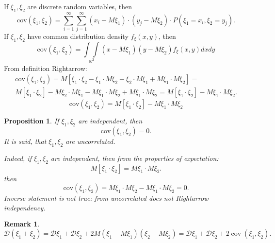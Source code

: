 \documentclass[12pt,letterpaper]{report}
\newtheorem{proposition}[theorem]{Proposition}  %
\newtheorem*{remark}{Remark}
\begin{document}
If $\xi_1, \xi_2$ are discrete random variables, then
\begin{equation}
    \text{cov}(\xi_1, \xi_2) = \sum_{i=1}^{\infty}\sum_{j=1}^{\infty} (x_i - M\xi_1) \cdot (y_j - M\xi_2) \cdot P(\xi_1 = x_i, \xi_2 = y_j).
\end{equation}
If $\xi_1,\xi_2$ have common distribution density $f_{\xi}(x,y)$, then 
\begin{equation}
    \text{cov}(\xi_1,\xi_2) = \underset{\mathbb{R}^2}{\int\int}(x-M\xi_1)(y-M\xi_2) f_{\xi}(x,y)dxdy
\end{equation}
From definition Rightarrow:
\begin{gather*}
    \text{cov}(\xi_1, \xi_2) = M[\xi_1\cdot\xi_2 - \xi_1\cdot M\xi_2 - \xi_2\cdot M\xi_1 + M\xi_1 \cdot M\xi_2] = \\
    M[\xi_1\cdot\xi_2] - M\xi_2\cdot M\xi_1 - M\xi_1\cdot M\xi_2 + M\xi_1 \cdot M\xi_2 =
    M[\xi_1 \cdot \xi_2] - M\xi_1 \cdot M\xi_2.
\end{gather*}
\begin{equation}
    \text{cov}(\xi_1,\xi_2) = M[\xi_1\cdot\xi_2] - M\xi_1\cdot M\xi_2
\end{equation}

\begin{proposition}
    If $\xi_1, \xi_2$ are independent, then
    \[
        \text{cov}(\xi_1, \xi_2) = 0
    .\] 
    It is said, that $\xi_1,\xi_2$ are uncorrelated.

    Indeed, if $\xi_1, \xi_2$ are independent, then from the properties of expectation:
    \[
        M[\xi_1\cdot\xi_2] = M\xi_1\cdot M\xi_2
    .\] 
    then 
    \[
        \text{cov}(\xi_1,\xi_2) = M\xi_1\cdot M\xi_2 - M\xi_1\cdot M\xi_2 = 0
    .\] 
    Inverse statement is not true: from uncorrelated does not Rightarrow independency.
\end{proposition}

\begin{remark}
    \[
        \mathcal{D}(\xi_1 + \xi_2) = \mathcal{D}\xi_1 + \mathcal{D}\xi_2 + 2M(\xi_1 - M\xi_1)(\xi_2 -M\xi_2) = \mathcal{D}\xi_1 + \mathcal{D}\xi_2 + 2\operatorname{cov}(\xi_1, \xi_2)
    .\] 
\end{remark}
\end{document}
